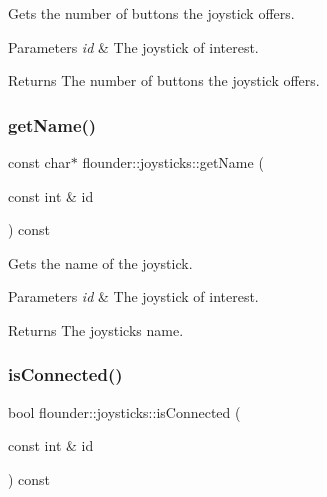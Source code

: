 Gets the number of buttons the joystick offers. 


\begin{DoxyParams}{Parameters}
{\em id} & The joystick of interest. \\
\hline
\end{DoxyParams}
\begin{DoxyReturn}{Returns}
The number of buttons the joystick offers. 
\end{DoxyReturn}
\mbox{\label{classflounder_1_1joysticks_ab42694655232c0cd832c56f6715b5f68}} 
\subsubsection{\texorpdfstring{get\+Name()}{getName()}}
{\footnotesize\ttfamily const char$\ast$ flounder\+::joysticks\+::get\+Name (\begin{DoxyParamCaption}\item[{const int \&}]{id }\end{DoxyParamCaption}) const\hspace{0.3cm}{\ttfamily [inline]}}



Gets the name of the joystick. 


\begin{DoxyParams}{Parameters}
{\em id} & The joystick of interest. \\
\hline
\end{DoxyParams}
\begin{DoxyReturn}{Returns}
The joysticks name. 
\end{DoxyReturn}
\mbox{\label{classflounder_1_1joysticks_a718814524adfee69d7a700831533c1f6}} 
\subsubsection{\texorpdfstring{is\+Connected()}{isConnected()}}
{\footnotesize\ttfamily bool flounder\+::joysticks\+::is\+Connected (\begin{DoxyParamCaption}\item[{const int \&}]{id }\end{DoxyParamCaption}) const\hspace{0.3cm}{\ttfamily [inline]}}



